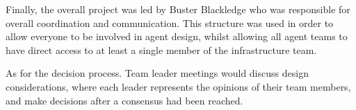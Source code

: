 
Finally, the overall project was led by Buster Blackledge who was responsible for overall coordination and communication. This structure was used in order to allow everyone to be involved in agent design, whilst allowing all agent teams to have direct access to at least a single member of the infrastructure team. 

As for the decision process. Team leader meetings would discuss design considerations, where each leader represents the opinions of their team members, and make decisions after a consensus had been reached. 


